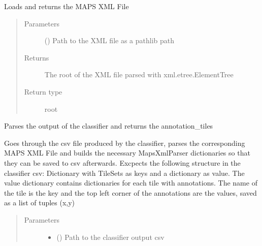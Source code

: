 \documentclass[letterpaper,10pt,english]{sphinxmanual}
\begin{document}
\begin{fulllineitems}
\begin{fulllineitems}
\label{\detokenize{index:sites_of_interest_parser.MapsXmlParser.load_xml}}
Loads and returns the MAPS XML File
\begin{quote}\begin{description}
\item[{Parameters}] \leavevmode
{} () \textendash{} Path to the XML file as a pathlib path

\item[{Returns}] \leavevmode
The root of the XML file parsed with xml.etree.ElementTree

\item[{Return type}] \leavevmode
root

\end{description}\end{quote}

\end{fulllineitems}


\begin{fulllineitems}
\label{\detokenize{index:sites_of_interest_parser.MapsXmlParser.parse_classifier_output}}
Parses the output of the classifier and returns the annotation\_tiles

Goes through the csv file produced by the classifier, parses the corresponding MAPS XML File and builds the
necessary MapsXmlParser dictionaries so that they can be saved to csv afterwards. Excpects the following
structure in the classifier csv:
Dictionary with TileSets as keys and a dictionary as value. The value dictionary contains dictionaries for each
tile with annotations. The name of the tile is the key and the top left corner of the annotations are the
values, saved as a list of tuples (x,y)
\begin{quote}\begin{description}
\item[{Parameters}] \leavevmode\begin{itemize}
\item {} 
 () \textendash{} Path to the classifier output csv


\end{itemize}
\end{description}
\end{quote}
\end{fulllineitems}
\end{fulllineitems}
\end{document}
